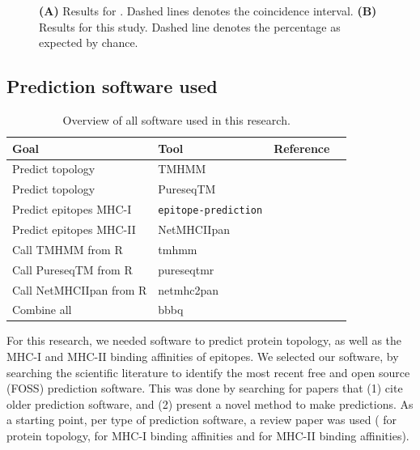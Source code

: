 \begin{figure}
  \caption{
    \textbf{(A)} 
    Results for \cite{bianchi2017}. 
    Dashed lines denotes the coincidence interval.
    \textbf{(B)}
    Results for this study.
    Dashed line denotes the percentage as expected by chance.
  }
\end{figure}

\clearpage

\subsection{Prediction software used}
\label{subsec:prediction_software_used}

\begin{table}[]
  \begin{tabular}{llll}
    Goal & Tool & Reference \\ 
    \hline
    Predict topology                  & TMHMM                     & \cite{krogh2001predicting} \\
    Predict topology                  & PureseqTM                 & \cite{wang2019efficient} \\
    Predict epitopes MHC-I            & \verb;epitope-prediction; & \cite{bianchi2017} \\
    Predict epitopes MHC-II           & NetMHCIIpan               & \cite{nielsen2008quantitative,karosiene2013netmhciipan} \\
    Call TMHMM from R                 & tmhmm                     & \cite{tmhmm} \\
    Call PureseqTM from R             & pureseqtmr                & \cite{pureseqtmr} \\
    Call NetMHCIIpan from R           & netmhc2pan                & \cite{netmhc2pan} \\
    Combine all                       & bbbq                      & \cite{bbbq}
  \end{tabular}
  \caption{
    Overview of all software used in this research.
  }
  \label{table:software_used}
\end{table}


For this research, we needed software to predict protein
topology, as well as the MHC-I and MHC-II binding affinities
of epitopes. We selected our software, by
searching the scientific literature 
to identify the most recent free and open source (FOSS) 
prediction software.
This was done by searching for papers that (1) cite older
prediction software, and (2) present a novel method to make predictions.
As a starting point, per type of prediction software,
a review paper was used (\cite{moller2001evaluation} for protein
topology, \cite{lundegaard2011prediction} for MHC-I
binding affinities and \cite{nielsen2003reliable} for MHC-II binding
affinities). 

